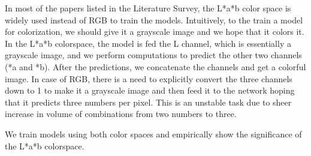 \documentclass[oneside,a4paper,12pt]{report}
\begin{document}
In most of the papers listed in the Literature Survey, the L*a*b color space is widely used instead of RGB to train the models. Intuitively, to the train a model for colorization, we should give it a grayscale image and we hope that it colors it. In the L*a*b colorspace, the model is fed the L channel, which is essentially a grayscale image, and we perform computations to predict the other two channels (*a and *b). After the predictions, we concatenate the channels and get a colorful image. In case of RGB, there is a need to explicitly convert the three channels down to 1 to make it a grayscale image and then feed it to the network hoping that it predicts three numbers per pixel. This is an unstable task due to sheer increase in volume of combinations from two numbers to three.

We train models using both color spaces and empirically show the significance of the L*a*b colorspace.
\end{document}
